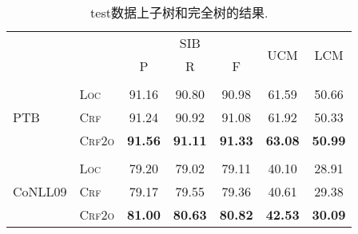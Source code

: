 \begin{table}[tb!]
    \setlength{\tabcolsep}{5pt}
    \centering
    \caption{test数据上子树和完全树的结果.}
    \begin{tabular}{llccccc}
        \toprule
                                 &                & \multicolumn{3}{c}{SIB} & \multirow{2}{*}{UCM} & \multirow{2}{*}{LCM}                                   \\
                                 &                & P                       & R                    & F                                                      \\[2pt]
        \hline
        \\[-15pt]
        \multirow{3}{*}{PTB}     & \textsc{Loc}   & 91.16                   & 90.80                & 90.98                & 61.59          & 50.66          \\
                                 & \textsc{Crf}   & 91.24                   & 90.92                & 91.08                & 61.92          & 50.33          \\
                                 & \textsc{Crf2o} & \textbf{91.56}          & \textbf{91.11}       & \textbf{91.33}       & \textbf{63.08} & \textbf{50.99} \\[2pt]
        \hline
        \\[-15pt]
        \multirow{3}{*}{CoNLL09} & \textsc{Loc}   & 79.20                   & 79.02                & 79.11                & 40.10          & 28.91          \\
                                 & \textsc{Crf}   & 79.17                   & 79.55                & 79.36                & 40.61          & 29.38          \\
                                 & \textsc{Crf2o} & \textbf{81.00}          & \textbf{80.63}       & \textbf{80.82}       & \textbf{42.53} & \textbf{30.09} \\
        \bottomrule
    \end{tabular}
    \label{table:dev-test-subtree}
\end{table}